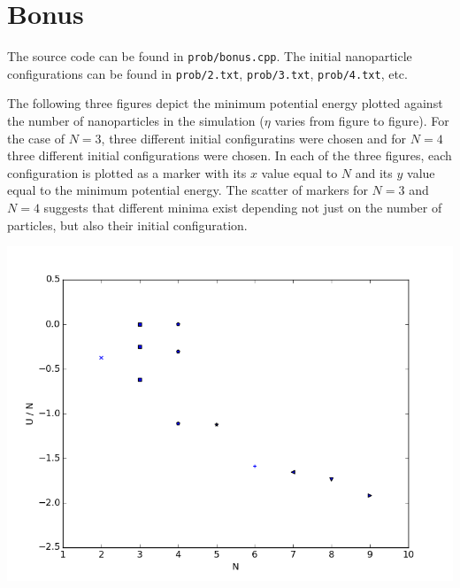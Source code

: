 \documentclass{article}
\begin{document}
\section{Bonus}

The source code can be found in \texttt{prob/bonus.cpp}.
The initial nanoparticle configurations can be found in \texttt{prob/2.txt}, \texttt{prob/3.txt}, \texttt{prob/4.txt}, etc.

The following three figures depict the minimum potential energy plotted against the number of nanoparticles in the simulation ($\eta$ varies from figure to figure).
For the case of $N = 3$, three different initial configuratins were chosen and for $N = 4$ three different initial configurations were chosen.
In each of the three figures, each configuration is plotted as a marker with its $x$ value equal to $N$ and its $y$ value equal to the minimum potential energy.
The scatter of markers for $N = 3$ and $N = 4$ suggests that different minima exist depending not just on the number of particles, but also their initial configuration.

{\centering
    \includegraphics[width=\linewidth]{bonus_eta00001}
    }
\end{document}
